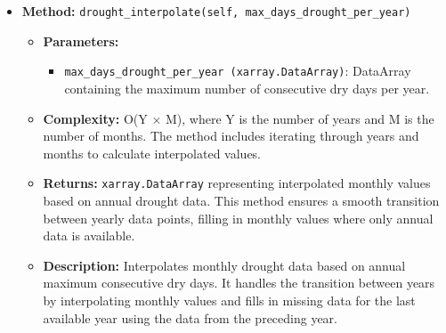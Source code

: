 \documentclass[a4paper,12pt]{article}
\begin{document}
\begin{itemize}
    \item \textbf{Method:} \texttt{drought\_interpolate(self, max\_days\_drought\_per\_year)}
    \begin{itemize}
        \item \textbf{Parameters:}
        \begin{itemize}
            \item \texttt{max\_days\_drought\_per\_year (xarray.DataArray)}: DataArray containing the maximum number of consecutive dry days per year.
        \end{itemize}
        \item \textbf{Complexity:} O(Y $\times$ M), where Y is the number of years and M is the number of months. The method includes iterating through years and months to calculate interpolated values.
        \item \textbf{Returns:} \texttt{xarray.DataArray} representing interpolated monthly values based on annual drought data. This method ensures a smooth transition between yearly data points, filling in monthly values where only annual data is available.
        \item \textbf{Description:} Interpolates monthly drought data based on annual maximum consecutive dry days. It handles the transition between years by interpolating monthly values and fills in missing data for the last available year using the data from the preceding year.
    \end{itemize}


\end{itemize}
\end{document}
